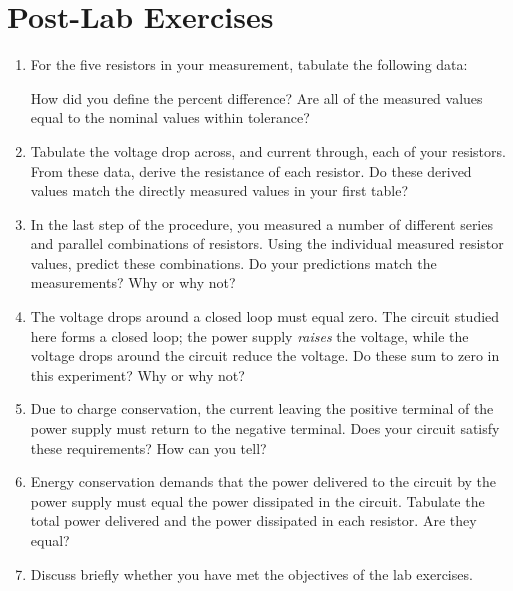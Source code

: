 \documentclass[12pt]{article}
\begin{document}
\newpage

\section*{Post-Lab Exercises}

\begin{enumerate}
\item For the five resistors in your measurement, tabulate the
  following data:
  How did you define the percent difference? Are all of the measured
  values equal to the nominal values within tolerance?
\item Tabulate the voltage drop across, and current through, each of
  your resistors.  From these data, derive the resistance of each
  resistor.  Do these derived values match the directly measured
  values in your first table?
\item In the last step of the procedure, you measured a number of
  different series and parallel combinations of resistors.  Using the
  individual measured resistor values, predict these combinations.  Do
  your predictions match the measurements?  Why or why not?
\item The voltage drops around a closed loop must equal zero.  The
  circuit studied here forms a closed loop; the power supply
  \textit{raises} the voltage, while the voltage drops around the
  circuit reduce the voltage.  Do these sum to zero in this
  experiment?  Why or why not?
\item Due to charge conservation, the current leaving the positive
  terminal of the power supply must return to the negative terminal.
  Does your circuit satisfy these requirements?  How can you tell?
\item Energy conservation demands that the power delivered to the
  circuit by the power supply must equal the power dissipated in the
  circuit.  Tabulate the total power delivered and the power
  dissipated in each resistor.  Are they equal?
\item Discuss briefly whether you have met the objectives of the lab
  exercises.
\end{enumerate}
\end{document}
